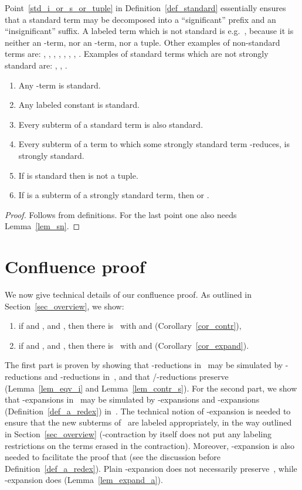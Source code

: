 \documentclass[a4paper,UKenglish]{lipics-v2016}
\begin{document}
Point~\ref{std_i_or_s_or_tuple} in Definition~\ref{def_standard}
essentially ensures that a standard term may be decomposed into a
``significant'' prefix and an ``insignificant'' suffix. A labeled term
which is not standard is e.g.~, because it is neither an
-term, nor an -term, nor a tuple. Other examples of non-standard
terms are: , ,
, , ,
,
, . Examples of standard terms which are not strongly standard are:
,
,
.

\begin{lemma}\label{lem_standard_properties}
  \begin{enumerate}
  \item Any -term is standard.
  \item Any labeled constant is standard.
  \item Every subterm of a standard term is also standard.
  \item Every subterm of a term to which some strongly standard term
    -reduces, is strongly standard.
  \item If  is standard then  is not a tuple.
  \item\label{prop_std_c_1} If  is a subterm of a
    strongly standard term, then  or
    .
  \end{enumerate}
\end{lemma}

\begin{proof}
  Follows from definitions. For the last point one also needs
  Lemma~\ref{lem_sn}.
\end{proof}

\section{Confluence proof}\label{sec_proof}

We now give technical details of our confluence proof. As outlined in
Section~\ref{sec_overview}, we show:
\begin{enumerate}
\item if  and , and ,
  then there is~ with  and 
  (Corollary~\ref{cor_contr}),
\item if  and , and
  , then there is~ with
   and  (Corollary~\ref{cor_expand}).
\end{enumerate}
The first part is proven by showing that -reductions in~ may
be simulated by -reductions and -reductions in~, and that
/-reductions preserve~ (Lemma~\ref{lem_eqv_i} and
Lemma~\ref{lem_contr_s}). For the second part, we show that
-expansions in~ may be simulated by -expansions and
-expansions (Definition~\ref{def_a_redex}) in~. The technical
notion of -expansion is needed to ensure that the new subterms
of~ are labeled appropriately, in the way outlined in
Section~\ref{sec_overview} (-contraction by itself does not put any
labeling restrictions on the terms erased in the
contraction). Moreover, -expansion is also needed to facilitate the
proof that  (see the discussion before
Definition~\ref{def_a_redex}). Plain -expansion does not
necessarily preserve~, while -expansion does
(Lemma~\ref{lem_expand_a}).
\end{document}

